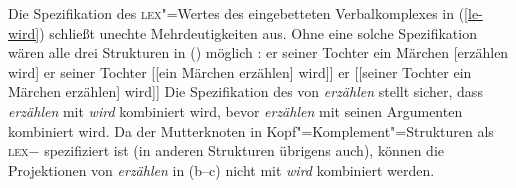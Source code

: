 Die Spezifikation des \textsc{lex}"=Wertes des eingebetteten Verbalkomplexes in (\ref{le-wird})
schließt unechte Mehrdeutigkeiten aus.
Ohne eine solche Spezifikation wären alle drei Strukturen in () möglich \parencites[]{Pollard90a}{HN94b}:
\eal
\ex er seiner Tochter  ein Märchen [erzählen wird]
\ex er seiner Tochter [[ein Märchen erzählen] wird]]\label{pvp-ein-maerchen-erzaehlen}
\ex er [[seiner Tochter ein Märchen erzählen] wird]]
\zl
Die Spezifikation des \lexwes von \emph{erzählen} stellt sicher, dass \emph{erzählen} mit \emph{wird} kombiniert wird,
bevor \emph{erzählen} mit seinen Argumenten kombiniert wird. Da der Mutterknoten in
Kopf"=Komplement"=Strukturen als \textsc{lex}$-$ spezifiziert ist (in anderen Strukturen übrigens auch), 
können die Projektionen
von \emph{erzählen} in (b--c) nicht mit \emph{wird} kombiniert werden.

